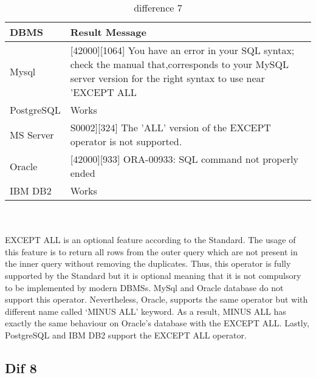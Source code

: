 \begin{table}[h]
\centering
\caption{difference 7}
\label{my-label}
\begin{tabular}{|p{2cm}|p{11.5cm}| }
\hline
\textbf{DBMS} & \textbf{Result Message}                                                                                                                                                 \\ \hline
Mysql         & {[}42000{]}{[}1064{]} You have an error in your SQL syntax; check the manual that,corresponds to your MySQL server version for the right syntax to use near 'EXCEPT ALL \\ \hline
PostgreSQL    & Works                                                                                                                                                                   \\ \hline
MS Server     & S0002{]}{[}324{]} The 'ALL' version of the EXCEPT operator is not supported.                                                                                            \\ \hline
Oracle        & {[}42000{]}{[}933{]} ORA-00933: SQL command not properly ended                                                                                                          \\ \hline
IBM DB2       & Works                                                                                                                                                                   \\ \hline
\end{tabular}
\end{table}

\hfill\\\\
EXCEPT ALL is an optional feature according to the Standard. The usage of this feature is to return all rows from the outer query which are not present in the inner query without removing the duplicates. Thus, this operator is fully supported by the Standard but it is optional meaning that it is not compulsory to be implemented by modern DBMSs. MySql and Oracle database do not support this operator. Nevertheless, Oracle, supports the same operator but with different name called ‘MINUS ALL’ keyword. As a result, MINUS ALL  has exactly the same behaviour on Oracle’s database with the EXCEPT ALL.  Lastly, PostgreSQL and IBM DB2 support the EXCEPT ALL operator. 


\subsection{Dif 8}
  
